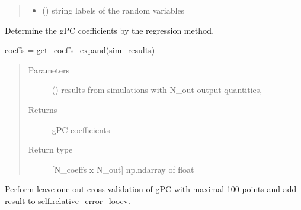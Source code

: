 \documentclass[letterpaper,10pt,english,openany,oneside]{sphinxmanual}
\begin{document}
\begin{fulllineitems}
\begin{quote}
\begin{description}
\begin{itemize}
\item {} 
 (\sphinxstyleliteralemphasis{\sphinxupquote{{[}}}\sphinxstyleliteralemphasis{\sphinxupquote{{]} }}\sphinxstyleliteralemphasis{\sphinxupquote{, }}\sphinxstyleliteralemphasis{\sphinxupquote{, }}) \textendash{} string labels of the random variables

\end{itemize}

\end{description}\end{quote}

\begin{fulllineitems}
\label{\detokenize{pygpc:pygpc.reg.Reg.get_coeffs}}
Determine the gPC coefficients by the regression method.

coeffs = get\_coeffs\_expand(sim\_results)
\begin{quote}\begin{description}
\item[{Parameters}] \leavevmode
{} (\sphinxstyleliteralemphasis{\sphinxupquote{{[}}}\sphinxstyleliteralemphasis{\sphinxupquote{{]} }}) \textendash{} results from simulations with N\_out output quantities,

\item[{Returns}] \leavevmode
{} \textendash{} gPC coefficients

\item[{Return type}] \leavevmode
{[}N\_coeffs x N\_out{]} np.ndarray of float

\end{description}\end{quote}

\end{fulllineitems}


\begin{fulllineitems}
\label{\detokenize{pygpc:pygpc.reg.Reg.loocv}}
Perform leave one out cross validation of gPC with maximal 100 points
and add result to self.relative\_error\_loocv.


\end{fulllineitems}
\end{fulllineitems}
\end{document}
